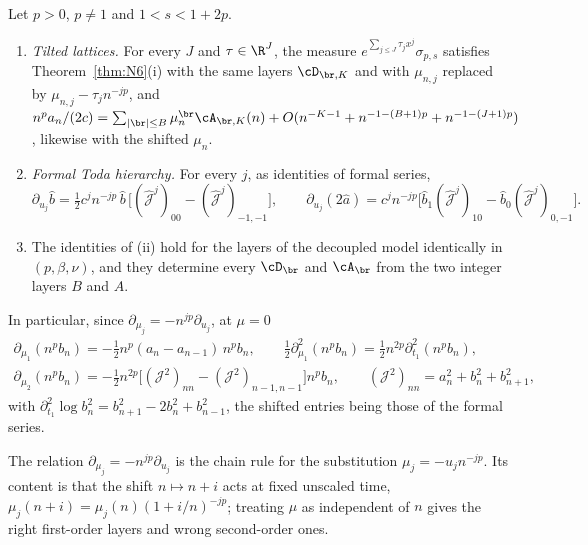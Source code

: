 \begin{theorem}\label{thm:toda}
Let $p>0$, $p\ne1$ and $1<s<1+2p$.
\begin{enumerate}
\item[(i)] \emph{Tilted lattices.} For every $J$ and $\tau\in\R^J$, the measure $e^{\sum_{j\le J}\tau_jx^j}\sigma_{p,s}$ satisfies
Theorem~\ref{thm:N6}(i) with the same layers $\cD_{\br,K}$ and with $\mu_{n,j}$ replaced by $\mu_{n,j}-\tau_jn^{-jp}$, and
$n^pa_n/(2c)=\sum_{|\br|\le B}\mu_n^{\br}\cA_{\br,K}(n)+O(n^{-K-1}+n^{-1-(B+1)p}+n^{-1-(J+1)p})$, likewise with the shifted $\mu_n$.
\item[(ii)] \emph{Formal Toda hierarchy.} For every $j$, as identities of formal series,
\[
  \partial_{u_j}\hat b=\tfrac12c^jn^{-jp}\,\hat b\,\bigl[(\hat{\mathcal J}^j)_{00}-(\hat{\mathcal J}^j)_{-1,-1}\bigr],\qquad
  \partial_{u_j}(2\hat a)=c^jn^{-jp}\bigl[\hat b_1(\hat{\mathcal J}^j)_{10}-\hat b_0(\hat{\mathcal J}^j)_{0,-1}\bigr].
\]
\item[(iii)] The identities of (ii) hold for the layers of the decoupled model identically in $(p,\beta,\nu)$, and they determine every
$\cD_{\br}$ and $\cA_{\br}$ from the two integer layers $B$ and $A$.
\end{enumerate}
In particular, since $\partial_{\mu_j}=-n^{jp}\partial_{u_j}$, at $\mu=0$
\begin{gather*}
  \partial_{\mu_1}(n^pb_n)=-\tfrac12n^p(a_n-a_{n-1})\,n^pb_n,\qquad
  \tfrac12\partial_{\mu_1}^2(n^pb_n)=\tfrac12n^{2p}\partial_{t_1}^2(n^pb_n),\\
  \partial_{\mu_2}(n^pb_n)=-\tfrac12n^{2p}\bigl[(\mathcal J^2)_{nn}-(\mathcal J^2)_{n-1,n-1}\bigr]n^pb_n,\qquad
  (\mathcal J^2)_{nn}=a_n^2+b_n^2+b_{n+1}^2,
\end{gather*}
with $\partial_{t_1}^2\log b_n^2=b_{n+1}^2-2b_n^2+b_{n-1}^2$, the shifted entries being those of the formal series.
\end{theorem}

The relation $\partial_{\mu_j}=-n^{jp}\partial_{u_j}$ is the chain rule for the substitution $\mu_j=-u_jn^{-jp}$. Its content is that the
shift $n\mapsto n+i$ acts at fixed unscaled time, $\mu_j(n+i)=\mu_j(n)(1+i/n)^{-jp}$; treating $\mu$ as independent of $n$ gives the
right first-order layers and wrong second-order ones.

